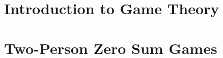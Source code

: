 \documentclass[a4paper,12pt]{article}
\begin{document}

\section{Introduction to Game Theory}






\section{Two-Person Zero Sum Games}










\end{document}
